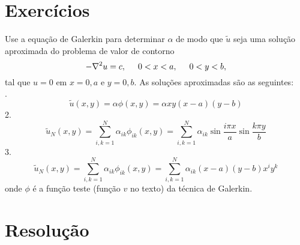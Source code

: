 \documentclass[10pt,a4paper]{article}
\begin{document}
	\section{Exercícios}
	Use a equação de Galerkin para determinar $\alpha$ de modo que $\tilde{u}$ seja uma solução aproximada do problema de valor de contorno
	\[-\nabla^2u=c, \hspace{0.5cm} 0<x<a, \hspace{0.5cm} 0<y<b,\]
	tal que $u=0$ em $x=0,a$ e $y=0,b$. As soluções aproximadas são as seguintes:\\

	. \[\tilde{u}(x,y) = \alpha\phi(x,y) = \alpha xy(x-a)(y-b)\]
	2. \[\tilde{u}_N(x,y) = \sum_{i,k=1}^N \alpha_{ik}\phi_{ik}(x,y) = \sum_{i,k=1}^N\alpha_{ik}\sin{\frac{i\pi x}{a}}\sin{\frac{k\pi y}{b}}\]
	3. \[\tilde{u}_N(x,y) = \sum_{i,k=1}^N \alpha_{ik}\phi_{ik}(x,y) = \sum_{i,k=1}^N\alpha_{ik}(x-a)(y-b)x^iy^k\]
	onde $\phi$ é a função teste (função $v$ no texto) da técnica de Galerkin.
	
	\section{Resolução}
\end{document}
